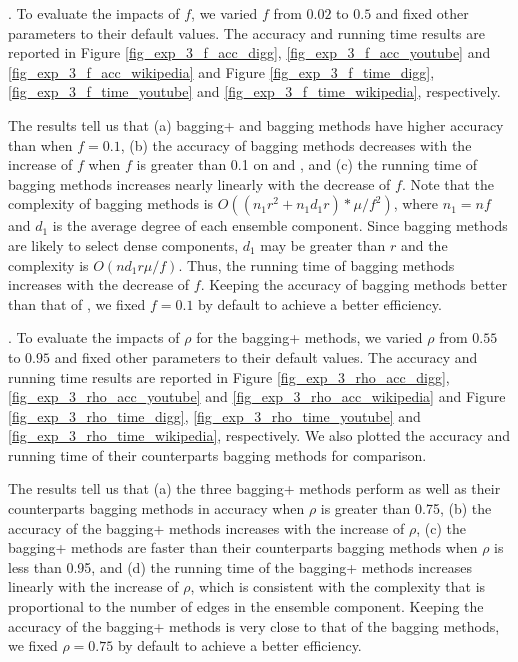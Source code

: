 . To evaluate the impacts of $f$, we
varied $f$ from $0.02$ to $0.5$ and fixed other parameters to their
default values. The accuracy and running time results are reported in
Figure \ref{fig_exp_3_f_acc_digg}, \ref{fig_exp_3_f_acc_youtube} and
\ref{fig_exp_3_f_acc_wikipedia} and Figure \ref{fig_exp_3_f_time_digg},
\ref{fig_exp_3_f_time_youtube} and \ref{fig_exp_3_f_time_wikipedia}, respectively.



The results tell us that (a) bagging+ and bagging methods have higher accuracy
than \NMF when $f = 0.1$, (b) the accuracy of bagging methods decreases
with the increase of $f$ when $f$ is greater than 0.1 on \Digg and \Wikipedia,
and (c) the running time of bagging methods increases
nearly linearly with the decrease of $f$. Note that the complexity of bagging methods is
$O((n_{1}r^2 + n_{1}d_{1}r)*\mu /f^2)$, where $n_1 = nf$ and $d_1$ is the average degree of
each ensemble component. Since bagging methods are likely to select dense components, $d_1$
may be greater than $r$ and the complexity is $O(nd_1r\mu /f)$. Thus, the running time
of bagging methods increases with the decrease of $f$. Keeping the accuracy of bagging
methods better than that of \NMF, we fixed $f = 0.1$ by default to achieve a better efficiency.




. To evaluate the impacts of $\rho$ for
the bagging+ methods, we varied $\rho$ from $0.55$ to $0.95$ and
fixed other parameters to their default values. The accuracy and
running time results are reported in
Figure \ref{fig_exp_3_rho_acc_digg}, \ref{fig_exp_3_rho_acc_youtube} and
\ref{fig_exp_3_rho_acc_wikipedia} and Figure \ref{fig_exp_3_rho_time_digg},
\ref{fig_exp_3_rho_time_youtube} and \ref{fig_exp_3_rho_time_wikipedia}, respectively.
We also plotted the accuracy and running time of their counterparts
bagging methods for comparison.

The results tell us that (a) the three bagging+ methods perform
as well as their counterparts bagging methods in accuracy when
$\rho$ is greater than 0.75, (b) the accuracy of the bagging+ methods
increases with the increase of $\rho$, (c) the bagging+ methods are faster
than their counterparts bagging methods when $\rho$ is less than 0.95,
and (d) the running time of the bagging+ methods increases linearly
with the increase of $\rho$, which is consistent with
the complexity that is proportional to the number of edges in the
ensemble component. Keeping the accuracy of the bagging+ methods is very close to
that of the bagging methods, we fixed $\rho = 0.75$ by default to achieve a better efficiency.



